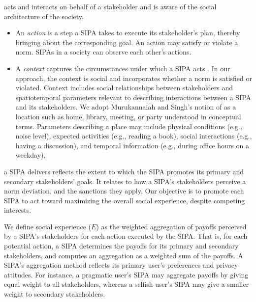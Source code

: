  acts and interacts on behalf of a stakeholder and
is aware of the social architecture of the society.

\begin{itemize}[nosep]
  \item An \emph{action} is a step a SIPA takes to execute its
    stakeholder's plan, thereby bringing about the corresponding goal.
    An action may satisfy or violate a norm. SIPAs in a society can
    observe each other's actions. 

  \item A \emph{context} captures the circumstances under which a SIPA acts \citep{Dey-2001-Context}. In our approach, the context is social and incorporates whether a norm is satisfied or violated. 
     Context includes social relationships between stakeholders and spatiotemporal parameters relevant to describing interactions between a SIPA and its stakeholders. We adopt Murukannaiah and Singh's  notion of  as a location such as home, library, meeting, or party understood in conceptual terms. Parameters describing a place may include physical conditions (e.g., noise level), expected activities (e.g., reading a book), social interactions (e.g., having a discussion), and temporal information (e.g., during office hours on a weekday). 

\end{itemize}

 a SIPA delivers reflects the extent to which the SIPA promotes its primary and secondary stakeholders' goals. It relates to how a SIPA's stakeholders perceive a norm deviation, and the sanctions they apply. Our objective is to promote each SIPA to act toward maximizing the overall social experience, despite competing interests. 

We define social experience ($E$) as the weighted aggregation of payoffs perceived by a SIPA's stakeholders for each action executed by the SIPA. That is, for each potential action, a SIPA determines the payoffs for its primary and secondary stakeholders, and computes an aggregation as a weighted sum of the payoffs.
%
A SIPA's aggregation method reflects its primary user's preferences and privacy attitudes. For instance, a pragmatic user's SIPA may aggregate payoffs by giving equal weight to all stakeholders, whereas a selfish user's SIPA may give a smaller weight to secondary stakeholders.

